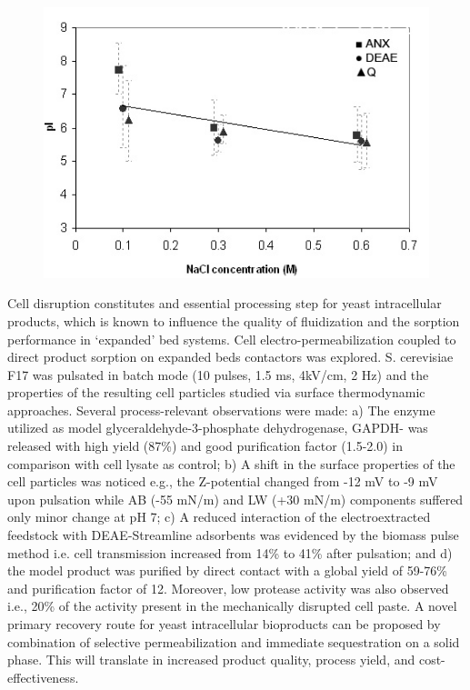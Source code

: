 \begin{figure}[ht]
  \begin{center}
   \includegraphics[width=\hsize]{Fernandez-Lahore/Fernandez-Lahore_new.png}
    \label{fig2:Lahore}
     \end{center}
\end{figure}

Cell disruption constitutes and essential processing step for yeast
intracellular products, which is known to influence the quality of
fluidization and the sorption performance in `expanded' bed systems.
Cell electro-permeabilization coupled to direct product sorption on
expanded beds contactors was explored. S. cerevisiae F17 was pulsated in
batch mode (10 pulses, 1.5 ms, 4kV/cm, 2 Hz) and the properties of the
resulting cell particles studied via surface thermodynamic approaches.
Several process-relevant observations were made: a) The enzyme utilized
as model glyceraldehyde-3-phosphate dehydrogenase, GAPDH- was
released with high yield (87\%) and good purification factor (1.5-2.0)
in comparison with cell lysate as control; b) A shift in the surface
properties of the cell particles was noticed e.g., the Z-potential
changed from -12 mV to -9 mV upon pulsation while AB (-55 mN/m) and LW
(+30 mN/m) components suffered only minor change
at pH 7; c) A reduced interaction of the electroextracted feedstock with
DEAE-Streamline adsorbents was evidenced by the biomass pulse method
i.e. cell transmission increased from 14\% to 41\% after pulsation; and
d) the model product was purified by direct contact with a global yield
of 59-76\% and purification factor of 12. Moreover, low protease
activity was also observed i.e., 20\% of the activity present in the
mechanically disrupted cell paste.
A novel primary recovery route for yeast intracellular bioproducts can
be proposed by combination of selective permeabilization and immediate
sequestration on a solid phase. This will translate in increased product
quality, process yield, and cost-effectiveness.


